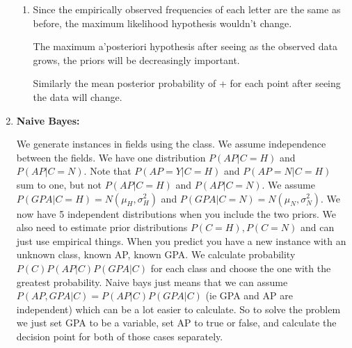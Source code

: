 \documentclass[12pt]{article}
\begin{document}
\begin{enumerate}
\begin{enumerate}
\item %
Since the empirically observed frequencies of each letter are the same as before, the maximum likelihood hypothesis wouldn't change. 

The maximum a'posteriori hypothesis after seeing as the observed data grows, the priors will be decreasingly important.

Similarly the mean posterior probability of + for each point after seeing the data will change.



\end{enumerate}
\item \textbf{Naive Bayes:}

 We generate instances in fields using the class. We assume independence between the fields. We have one distribution $P(AP|C=H)$ and $P(AP|C=N)$.  Note that $P(AP=Y|C=H)$ and $P(AP=N|C=H)$ sum to one, but not $P(AP|C=H)$ and $P(AP|C=N)$. We assume $P(GPA|C=H)=N(\mu_H,\sigma_H^2)$ and $P(GPA|C=N)=N(\mu_N,\sigma_N^2)$. We now have 5 independent distributions when you include the two priors. We also need to estimate prior distributions $P(C=H), P(C=N)$ and can just use empirical things. When you predict you have a new instance with an unknown class, known AP, known GPA. We calculate probability $P(C)P(AP|C)P(GPA|C)$ for each class and choose the one with the greatest probability. Naive bays just means that we can assume $P(AP,GPA|C) = P(AP|C)P(GPA|C)$ (ie GPA and AP are independent) which can be a lot easier to calculate. So to solve the problem we just set GPA to be a variable, set AP to true or false, and calculate the decision point for both of those cases separately.



\end{enumerate}
\end{document}
